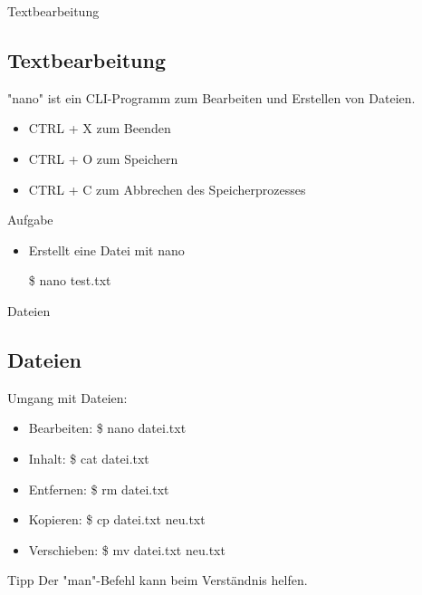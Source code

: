\begin{frame}{Textbearbeitung}
    \subsection{Textbearbeitung}\label{subsec:textbearbeitung}

    "nano" ist ein CLI-Programm zum Bearbeiten und Erstellen von Dateien.

    \begin{itemize}
        \item CTRL + X zum Beenden
        \item CTRL + O zum Speichern
        \item CTRL + C zum Abbrechen des Speicherprozesses
    \end{itemize}

    \vspace{0.5cm}
    \begin{alertblock}{Aufgabe}
        \begin{itemize}
            \item Erstellt eine Datei mit nano
            \item[\$] nano test.txt
        \end{itemize}
    \end{alertblock}

\end{frame}

\begin{frame}{Dateien}
    \subsection{Dateien}\label{subsec:dateien}

    Umgang mit Dateien:

    \begin{itemize}
        \item Bearbeiten: \$ nano datei.txt
        \item Inhalt: \$ cat datei.txt
        \item Entfernen: \$ rm datei.txt
        \item Kopieren: \$ cp datei.txt neu.txt
        \item Verschieben: \$ mv datei.txt neu.txt
    \end{itemize}

    \vspace{0.5cm}
    \begin{exampleblock}{Tipp}
        Der "man"-Befehl kann beim Verständnis helfen.
    \end{exampleblock}

\end{frame}



